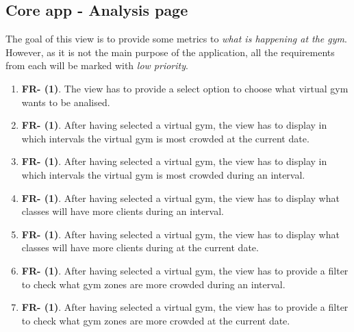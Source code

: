 \documentclass[a4paper, 12pt, oneside]{book}
\begin{document}
\subsection{Core app - Analysis page}
The goal of this view is to provide some metrics to \emph{what is happening at the gym}. However, as it is not the main purpose of the application, all the requirements from each will be marked with \emph{low priority}.
\begin{enumerate}[label = -]
	\item \textbf{FR- (1)}. The view has to provide a select option to choose what virtual gym wants to be analised.
	\item \textbf{FR- (1)}. After having selected a virtual gym, the view has to display in which intervals the virtual gym is most crowded at the current date.
	\item \textbf{FR- (1)}. After having selected a virtual gym, the view has to display in which intervals the virtual gym is most crowded during an interval.
	\item \textbf{FR- (1)}. After having selected a virtual gym, the view has to display what classes will have more clients during an interval.
	\item \textbf{FR- (1)}. After having selected a virtual gym, the view has to display what classes will have more clients during at the current date.
	\item \textbf{FR- (1)}. After having selected a virtual gym, the view has to provide a filter to check what gym zones are more crowded during an interval.
	\item \textbf{FR- (1)}. After having selected a virtual gym, the view has to provide a filter to check what gym zones are more crowded at the current date.
\end{enumerate}
\end{document}
